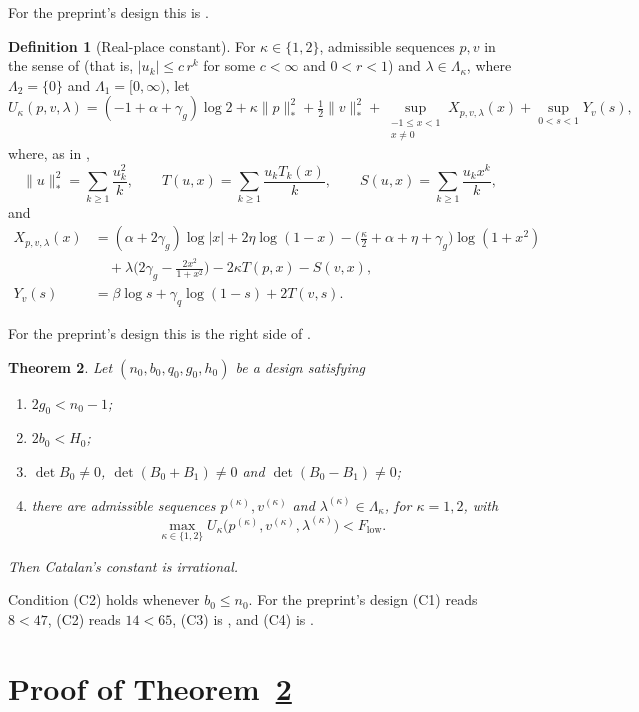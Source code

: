 \documentclass[11pt]{article}
\newtheorem{theorem}{Theorem}
\theoremstyle{definition}
\newtheorem{definition}[theorem]{Definition}
\begin{document}
For the preprint's design this is \cite[Eq.~(47)]{OAI}.

\begin{definition}[Real-place constant]\label{def:upper}
For $\kappa\in\{1,2\}$, admissible sequences $p,v$ in the sense of \cite[Sec.~6]{OAI} (that is, $|u_k|\le c\,r^k$ for some $c<\infty$ and $0<r<1$) and $\lambda\in\Lambda_\kappa$, where $\Lambda_2=\{0\}$ and $\Lambda_1=[0,\infty)$, let
\[
U_\kappa(p,v,\lambda)=(-1+\alpha+\gamma_g)\log2+\kappa\|p\|_*^2+\tfrac12\|v\|_*^2+\sup_{\substack{-1\le x<1\\x\ne0}}X_{p,v,\lambda}(x)+\sup_{0<s<1}Y_v(s),
\]
where, as in \cite[Eq.~(77)]{OAI},
\[
\|u\|_*^2=\sum_{k\ge1}\frac{u_k^2}k,\qquad T(u,x)=\sum_{k\ge1}\frac{u_kT_k(x)}k,\qquad S(u,x)=\sum_{k\ge1}\frac{u_kx^k}k,
\]
and
\begin{align*}
X_{p,v,\lambda}(x)&=(\alpha+2\gamma_g)\log|x|+2\eta\log(1-x)-\Big(\frac\kappa2+\alpha+\eta+\gamma_g\Big)\log(1+x^2)\\
&\quad+\lambda\Big(2\gamma_g-\frac{2x^2}{1+x^2}\Big)-2\kappa T(p,x)-S(v,x),\\
Y_v(s)&=\beta\log s+\gamma_q\log(1-s)+2T(v,s).
\end{align*}
\end{definition}

For the preprint's design this is the right side of \cite[Eq.~(78)]{OAI}.

\begin{theorem}\label{thm:main}
Let $(n_0,b_0,q_0,g_0,h_0)$ be a design satisfying
\begin{enumerate}
\item[(C1)] $2g_0<n_0-1$;
\item[(C2)] $2b_0<H_0$;
\item[(C3)] $\det B_0\ne0$, $\det(B_0+B_1)\ne0$ and $\det(B_0-B_1)\ne0$;
\item[(C4)] there are admissible sequences $p^{(\kappa)},v^{(\kappa)}$ and $\lambda^{(\kappa)}\in\Lambda_\kappa$, for $\kappa=1,2$, with
\[
\max_{\kappa\in\{1,2\}}U_\kappa\big(p^{(\kappa)},v^{(\kappa)},\lambda^{(\kappa)}\big)<F_{\mathrm{low}} .
\]
\end{enumerate}
Then Catalan's constant is irrational.
\end{theorem}

Condition (C2) holds whenever $b_0\le n_0$. For the preprint's design (C1) reads $8<47$, (C2) reads $14<65$, (C3) is \cite[Eq.~(48)]{OAI}, and (C4) is \cite[Props.~3.4 and 7.1]{OAI}.

\section{Proof of Theorem~\ref{thm:main}}\label{sec:proof}
\end{document}
